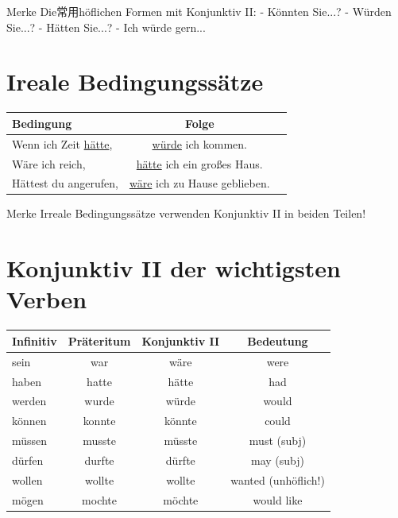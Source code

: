 \begin{infobox}{Merke}
Die常用höflichen Formen mit Konjunktiv II:
- Könnten Sie...?
- Würden Sie...?
- Hätten Sie...?
- Ich würde gern...
\end{infobox}

\section{Ireale Bedingungssätze}
\label{sec:B2Irreal}

\begin{center}
\begin{tabular}{|l|c|c|}
\hline
Bedingung & Folge & \\ \hline
Wenn ich Zeit \underline{hätte}, & \underline{würde} ich kommen. & \\ \hline
Wäre ich reich, & \underline{hätte} ich ein großes Haus. & \\ \hline
Hättest du angerufen, & \underline{wäre} ich zu Hause geblieben. & \\ \hline
\end{tabular}
\end{center}

\begin{tippbox}{Merke}
Irreale Bedingungssätze verwenden Konjunktiv II in beiden Teilen!
\end{tippbox}

\section{Konjunktiv II der wichtigsten Verben}
\label{sec:B2KonjIIVerben}

\begin{center}
\begin{tabular}{|l|c|c|c|}
\hline
Infinitiv & Präteritum & Konjunktiv II & Bedeutung \\ \hline
sein & war & wäre & were \\ \hline
haben & hatte & hätte & had \\ \hline
werden & wurde & würde & would \\ \hline
können & konnte & könnte & could \\ \hline
müssen & musste & müsste & must (subj) \\ \hline
dürfen & durfte & dürfte & may (subj) \\ \hline
wollen & wollte & wollte & wanted (unhöflich!) \\ \hline
mögen & mochte & möchte & would like \\ \hline
\end{tabular}
\end{center}

